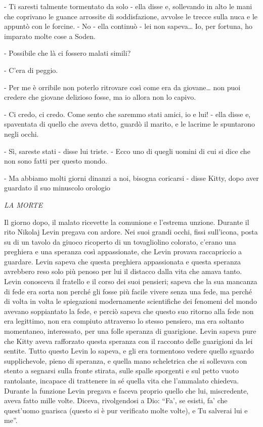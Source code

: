 - Ti saresti talmente tormentato da solo - ella disse e, sollevando in alto le mani che coprivano le guance arrossite di soddisfazione, avvolse le trecce sulla nuca e le appuntò con le forcine. - No - ella continuò - lei non sapeva\ldots{} Io, per fortuna, ho imparato molte cose a Soden. 

- Possibile che là ci fossero malati simili? 

- C'era di peggio. 

- Per me è orribile non poterlo ritrovare così come era da giovane\ldots{} non puoi credere che giovane delizioso fosse, ma io allora non lo capivo. 

- Ci credo, ci credo. Come sento che saremmo stati amici, io e lui! - ella disse e, spaventata di quello che aveva detto, guardò il marito, e le lacrime le spuntarono negli occhi. 

- Sì, sareste stati - disse lui triste. - Ecco uno di quegli uomini di cui si dice che non sono fatti per questo mondo. 

- Ma abbiamo molti giorni dinanzi a noi, bisogna coricarsi - disse Kitty, dopo aver guardato il suo minuscolo orologio 

\label{xx-4} 

\emph{LA MORTE} 

Il giorno dopo, il malato ricevette la comunione e l'estrema unzione. Durante il rito Nikolaj Levin pregava con ardore. Nei suoi grandi occhi, fissi sull'icona, posta su di un tavolo da giuoco ricoperto di un tovagliolino colorato, c'erano una preghiera e una speranza così appassionate, che Levin provava raccapriccio a guardare. Levin sapeva che questa preghiera appassionata e questa speranza avrebbero reso solo più penoso per lui il distacco dalla vita che amava tanto. Levin conosceva il fratello e il corso dei suoi pensieri; sapeva che la sua mancanza di fede era sorta non perché gli fosse più facile vivere senza una fede, ma perché di volta in volta le spiegazioni modernamente scientifiche dei fenomeni del mondo avevano soppiantato la fede, e perciò sapeva che questo suo ritorno alla fede non era legittimo, non era compiuto attraverso lo stesso pensiero, ma era soltanto momentaneo, interessato, per una folle speranza di guarigione. Levin sapeva pure che Kitty aveva rafforzato questa speranza con il racconto delle guarigioni da lei sentite. Tutto questo Levin lo sapeva, e gli era tormentoso vedere quello sguardo supplichevole, pieno di speranza, e quella mano scheletrica che si sollevava con stento a segnarsi sulla fronte stirata, sulle spalle sporgenti e sul petto vuoto rantolante, incapace di trattenere in sé quella vita che l'ammalato chiedeva. Durante la funzione Levin pregava e faceva proprio quello che lui, miscredente, aveva fatto mille volte. Diceva, rivolgendosi a Dio: ``Fa', se esisti, fa' che quest'uomo guarisca (questo si è pur verificato molte volte), e Tu salverai lui e me''. 


